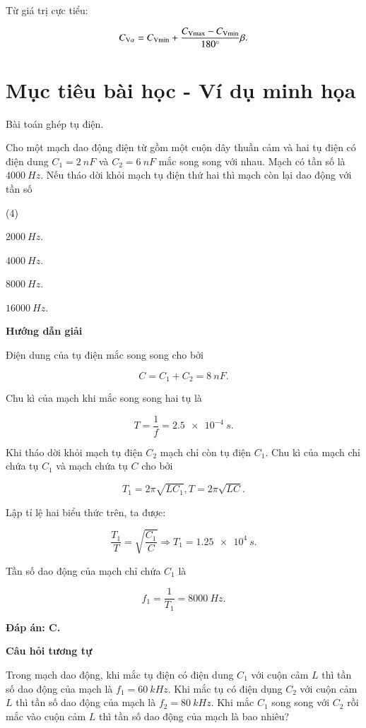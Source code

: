 Từ giá trị cực tiểu:

$$C_{\text V{\alpha}}= C_\text{V\text{min}} + \dfrac{C_\text{V\text{max}}- C_\text{V\text{min}}}{180^\circ}\beta.$$


\section{Mục tiêu bài học - Ví dụ minh họa}
\begin{dang}{Bài toán ghép tụ điện.}
	{Cho một mạch dao động điện từ gồm một cuộn dây thuần cảm và hai tụ điện có điện dung $C_1 = \SI{2}{nF}$ và $C_2 = \SI{6}{nF}$ mắc song song với nhau. Mạch có tần số là $\SI{4000}{Hz}$. Nếu  tháo dời khỏi mạch tụ điện thứ hai thì mạch còn lại dao động với tần số
		\begin{mcq}(4)
			\item $\SI{2000}{Hz}$. 
			\item $\SI{4000}{Hz}$. 
			\item $\SI{8000}{Hz}$. 
			\item $\SI{16000}{Hz}$. 
		\end{mcq}
	}
	{	\begin{center}
			\textbf{Hướng dẫn giải}
		\end{center}
		
		Điện dung của tụ điện mắc song song cho bởi
		
		$$C=C_{1}+C_{2}= \SI{8}{nF}.$$
		
		Chu kì của mạch khi mắc song song hai tụ là
		
		$$T=\dfrac{1}{f}= \SI{2,5 e-4}{s}.$$
		
		Khi tháo dời khỏi mạch tụ điện $C_{2}$ mạch chỉ còn tụ điện $C_{1}$. Chu kì của mạch chỉ chứa tụ $C_{1}$ và mạch chứa tụ $C$ cho bởi
		
		$$T_{1} =2 \pi \sqrt{L C_{1}}, T =2 \pi \sqrt{L C}.$$
		
		Lập tỉ lệ hai biểu thức trên, ta được:
		
		$$\dfrac{T_{1}}{T}=\sqrt{\dfrac{C_{1}}{C}}\Rightarrow T_{1}= \SI{1,25 e4}{s}.$$
		
		Tần số dao động của mạch chỉ chứa $C_{1}$ là
		
		$$f_{1}=\dfrac{1}{T_{1}}= \SI{8000}{Hz}.$$	
		
		\textbf{Đáp án: C.}
		
		\begin{center}
			\textbf{Câu hỏi tương tự}
		\end{center}
		
		Trong mạch dao động, khi mắc tụ điện có điện dung $C_1$ với cuộn cảm $L$ thì tần số dao động của mạch là $f_1 = \SI{60}{kHz}$. Khi mắc tụ có điện dụng $C_2$ với cuộn cảm $L$ thì tần số dao động của mạch là $f_2 = \SI{80}{kHz}$. Khi mắc $C_1$ song song với $C_2$ rồi mắc vào cuộn cảm $L$ thì tần số dao động của mạch là bao nhiêu?
		
}
\end{dang}
